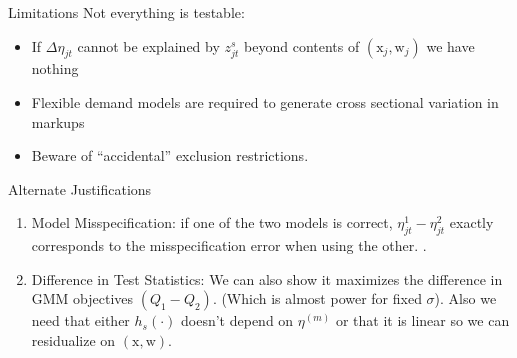 \documentclass[aspectratio=169,10pt]{beamer}
\begin{document}
\begin{frame}[plain]{Limitations}
Not everything is testable:
\begin{itemize}
\item If $\Delta \eta_{jt}$ cannot be explained by $z_{jt}^s$ beyond contents of $(\mathrm{x}_j,\mathrm{w}_j)$ we have nothing
\item Flexible demand models are required to generate cross sectional variation in markups
\item Beware of ``accidental'' exclusion restrictions.
\end{itemize}
\end{frame}

\begin{frame}[plain,label=advantages]{Alternate Justifications}
\begin{enumerate}
\item Model Misspecification: if one of the two models is correct, $\eta^1_{jt}-\eta_{jt}^2$ exactly corresponds to the misspecification error when using the other. \hyperlink{misspecification}{}. 
\item Difference in Test Statistics: We can also show it maximizes the difference in GMM objectives $(Q_1 - Q_2)$. (Which is almost power for fixed $\sigma$). Also we need that either $h_s(\cdot)$ doesn't depend on $\eta^{(m)}$ or that it is linear so we can residualize on $(\textrm{x},\text{w})$.
\end{enumerate}
\end{frame}
\end{document}
